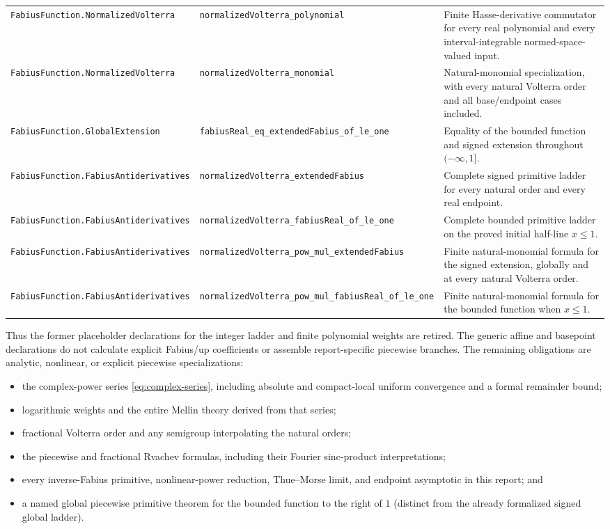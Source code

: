 \documentclass[11pt,oneside]{article}
\numberwithin{equation}{section}
\theoremstyle{definition}
\theoremstyle{remark}
\newcommand{\decl}[1]{\nolinkurl{#1}}
\begin{document}
\begin{longtable}{@{}>{\raggedright\arraybackslash}p{}>{\raggedright\arraybackslash}p{}>{\raggedright\arraybackslash}p{}@{}}
\decl{FabiusFunction.NormalizedVolterra} &
\decl{normalizedVolterra_polynomial} &
Finite Hasse-derivative commutator for every real polynomial and every
interval-integrable normed-space-valued input. \\
\decl{FabiusFunction.NormalizedVolterra} &
\decl{normalizedVolterra_monomial} &
Natural-monomial specialization, with every natural Volterra order and all
base/endpoint cases included. \\
\decl{FabiusFunction.GlobalExtension} &
\decl{fabiusReal_eq_extendedFabius_of_le_one} &
Equality of the bounded function and signed extension throughout
$(-\infty,1]$. \\
\decl{FabiusFunction.FabiusAntiderivatives} &
\decl{normalizedVolterra_extendedFabius} &
Complete signed primitive ladder for every natural order and every real
endpoint. \\
\decl{FabiusFunction.FabiusAntiderivatives} &
\decl{normalizedVolterra_fabiusReal_of_le_one} &
Complete bounded primitive ladder on the proved initial half-line $x\le1$. \\
\decl{FabiusFunction.FabiusAntiderivatives} &
\decl{normalizedVolterra_pow_mul_extendedFabius} &
Finite natural-monomial formula for the signed extension, globally and at
every natural Volterra order. \\
\decl{FabiusFunction.FabiusAntiderivatives} &
\decl{normalizedVolterra_pow_mul_fabiusReal_of_le_one} &
Finite natural-monomial formula for the bounded function when $x\le1$. \\
\bottomrule
\end{longtable}
\endgroup

Thus the former placeholder declarations for the integer ladder and finite
polynomial weights are retired.  The generic affine and basepoint declarations
do not calculate explicit Fabius/up coefficients or assemble report-specific
piecewise branches.  The remaining obligations are analytic, nonlinear, or
explicit piecewise specializations:
\begin{itemize}
\item the complex-power series \eqref{eq:complex-series}, including absolute
and compact-local uniform convergence and a formal remainder bound;
\item logarithmic weights and the entire Mellin theory derived from that
series;
\item fractional Volterra order and any semigroup interpolating the natural
orders;
\item the piecewise and fractional Rvachev formulas, including their Fourier
sinc-product interpretations;
\item every inverse-Fabius primitive, nonlinear-power reduction, Thue--Morse
limit, and endpoint asymptotic in this report; and
\item a named global piecewise primitive theorem for the bounded function to
the right of $1$ (distinct from the already formalized signed global ladder).
\end{itemize}
\end{document}
